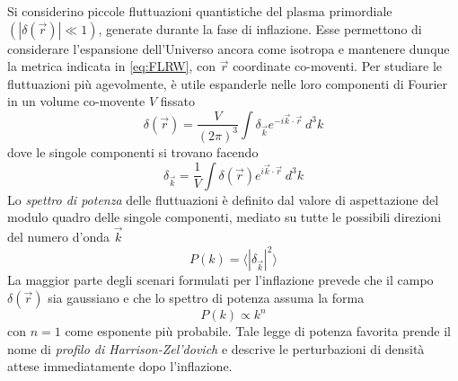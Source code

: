 Si considerino piccole fluttuazioni quantistiche del plasma primordiale $(|\delta(\vec{r}) |\ll 1)$, generate durante la fase di inflazione. 
Esse permettono di considerare l'espansione dell'Universo ancora come isotropa e mantenere dunque la metrica indicata in \ref{eq:FLRW}, con $\vec{r}$ coordinate co-moventi.
Per studiare le fluttuazioni più agevolmente, è utile espanderle nelle loro componenti di Fourier in un volume co-movente $V$ fissato 
\begin{equation}
    \delta(\vec{r})=\frac{V}{(2\pi)^3}\int \delta_{\vec{k}}e^{-i\vec{k}\cdot \vec{r}}\ d^3k
\end{equation}
dove le singole componenti si trovano facendo 
\begin{equation}
    \delta_{\vec{k}}=\frac{1}{V}\int \delta(\vec{r})e^{i\vec{k}\cdot \vec{r}}\ d^3k
\end{equation}
Lo \emph{spettro di potenza} delle fluttuazioni è definito dal valore di aspettazione del modulo quadro delle singole componenti, mediato su tutte le possibili direzioni del numero d'onda $\vec{k}$
\begin{equation}
    P(k)=\langle| \delta_{\vec{k}}|^2\rangle
\end{equation}
La maggior parte degli scenari formulati per l'inflazione prevede che il campo $\delta(\vec{r})$ sia gaussiano e che lo spettro di potenza assuma la forma 
\begin{equation}
    P(k) \propto k^n 
\end{equation}
con $n=1$ come esponente più probabile. 
Tale legge di potenza favorita prende il nome di \emph{profilo di Harrison-Zel'dovich} e descrive le perturbazioni di densità attese immediatamente dopo l'inflazione. 

